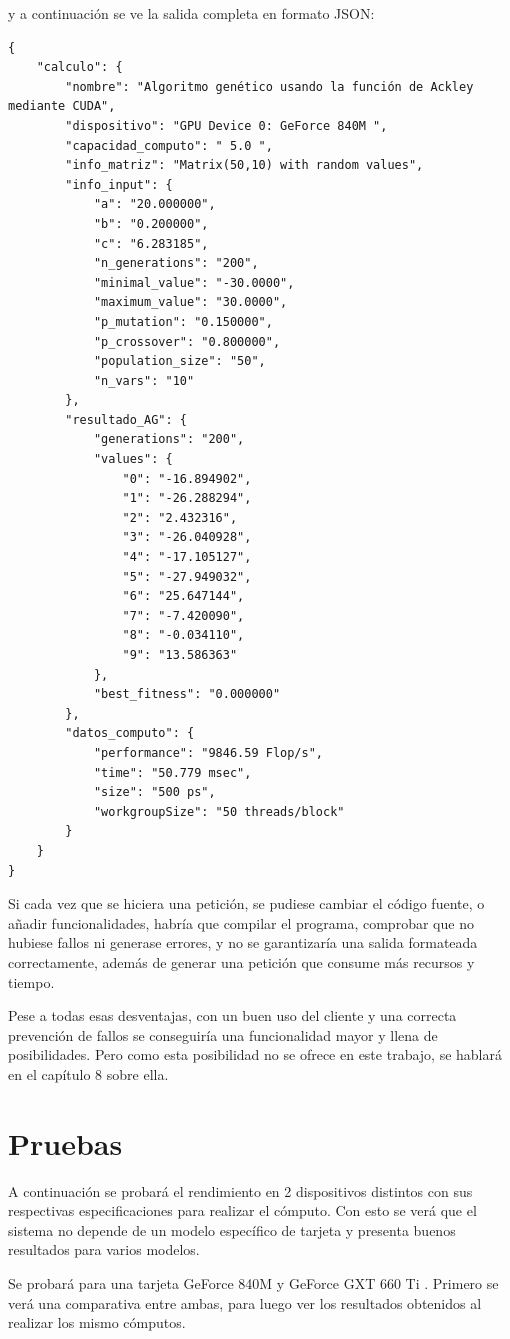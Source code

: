 \bigskip
y a continuación se ve la salida completa en formato JSON:

\begin{lstlisting}
{
	"calculo": {
		"nombre": "Algoritmo genético usando la función de Ackley mediante CUDA",
		"dispositivo": "GPU Device 0: GeForce 840M ",
		"capacidad_computo": " 5.0 ",
		"info_matriz": "Matrix(50,10) with random values",
		"info_input": {
			"a": "20.000000",
			"b": "0.200000",
			"c": "6.283185",
			"n_generations": "200",
			"minimal_value": "-30.0000",
			"maximum_value": "30.0000",
			"p_mutation": "0.150000",
			"p_crossover": "0.800000",
			"population_size": "50",
			"n_vars": "10"
		},
		"resultado_AG": {
			"generations": "200",
			"values": {
				"0": "-16.894902",
				"1": "-26.288294",
				"2": "2.432316",
				"3": "-26.040928",
				"4": "-17.105127",
				"5": "-27.949032",
				"6": "25.647144",
				"7": "-7.420090",
				"8": "-0.034110",
				"9": "13.586363"
			},
			"best_fitness": "0.000000"
		},
		"datos_computo": {
			"performance": "9846.59 Flop/s",
			"time": "50.779 msec",
			"size": "500 ps",
			"workgroupSize": "50 threads/block"
		}
	}
}
\end{lstlisting}


\bigskip
Si cada vez que se hiciera una petición, se pudiese cambiar el código fuente, o añadir funcionalidades, habría que compilar el programa, comprobar que no hubiese fallos ni generase errores, y no se garantizaría una salida formateada correctamente, además de generar una petición que consume más recursos y tiempo.

\bigskip
Pese a todas esas desventajas, con un buen uso del cliente y una correcta prevención de fallos se conseguiría una funcionalidad mayor y llena de posibilidades. Pero como esta posibilidad no se ofrece en este trabajo, se hablará en el capítulo 8 sobre ella.


\newpage
\section{Pruebas}
\bigskip

A continuación se probará el rendimiento en 2 dispositivos distintos con sus respectivas especificaciones para realizar el cómputo. Con esto se verá que el sistema no depende de un modelo específico de tarjeta y presenta buenos resultados para varios modelos.

Se probará para una tarjeta GeForce 840M \cite{geforce840m} y GeForce GXT 660 Ti \cite{geforcegtx660}. Primero se verá una comparativa entre ambas, para luego ver los resultados obtenidos al realizar los mismo cómputos.

